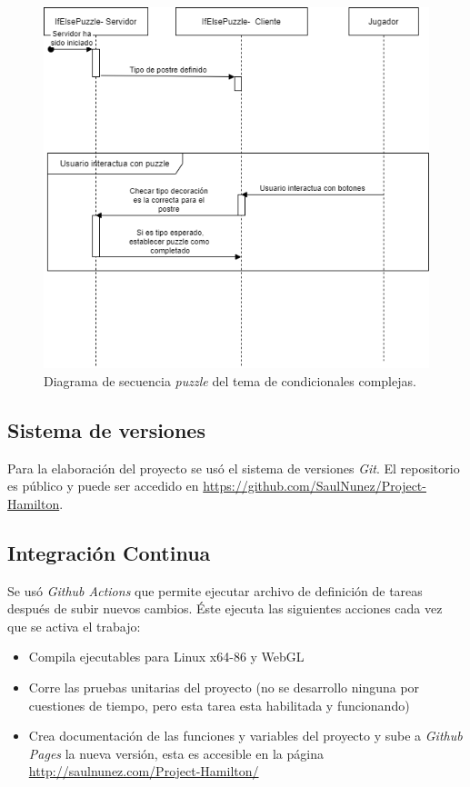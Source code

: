 \begin{itemize}
\begin{figure}[H]
        \centering
        \includegraphics[width=0.8\linewidth]{images/DiagramaSecuenciaPuzzleIfElse.png}
        \caption{Diagrama de secuencia \textit{puzzle} del tema de condicionales complejas.}
        \label{fig:diagrama_sec_if_else}
    \end{figure}
\end{itemize}


\subsection{Sistema de versiones}
Para la elaboración del proyecto se usó el sistema de versiones \textit{Git}. El repositorio es público y puede ser accedido en \url{https://github.com/SaulNunez/Project-Hamilton}.

\subsection{Integración Continua}
Se usó \textit{Github Actions} que permite ejecutar archivo de definición de tareas después de subir nuevos cambios.
Éste ejecuta las siguientes acciones cada vez que se activa el trabajo:
\begin{itemize}
    \item Compila ejecutables para Linux x64-86 y WebGL
    \item Corre las pruebas unitarias del proyecto (no se desarrollo ninguna por cuestiones de tiempo, pero esta tarea esta habilitada y funcionando) 
    \item Crea documentación de las funciones y variables del proyecto y sube a \textit{Github Pages} la nueva versión, esta es accesible en la página  \url{http://saulnunez.com/Project-Hamilton/}
\end{itemize}

